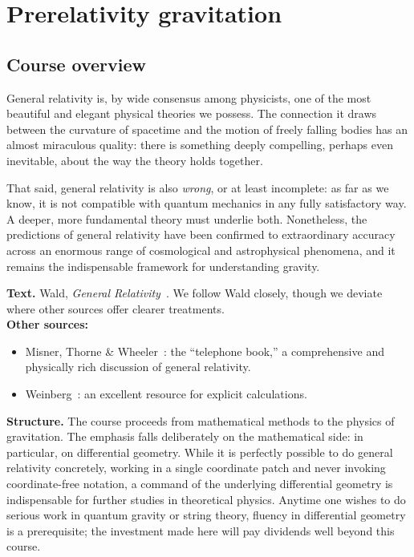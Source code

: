 
\section{Prerelativity gravitation}\label{sec:prerelativity}

\subsection{Course overview}

General relativity is, by wide consensus among physicists, one of the
most beautiful and elegant physical theories we possess.  The connection
it draws between the curvature of spacetime and the motion of freely
falling bodies has an almost miraculous quality: there is something
deeply compelling, perhaps even inevitable, about the way the theory
holds together.

That said, general relativity is also \emph{wrong}, or at least
incomplete: as far as we know, it is not compatible with quantum
mechanics in any fully satisfactory way.  A deeper, more fundamental
theory must underlie both.  Nonetheless, the predictions of general
relativity have been confirmed to extraordinary accuracy across an
enormous range of cosmological and astrophysical phenomena, and it
remains the indispensable framework for understanding gravity.

\medskip
\noindent\textbf{Text.} Wald, \emph{General Relativity}~\cite{Wald84}.
We follow Wald closely, though we deviate where other sources offer
clearer treatments.\\
\textbf{Other sources:}
\begin{itemize}
  \item Misner, Thorne \& Wheeler~\cite{MTW73}: the ``telephone
    book,'' a comprehensive and physically rich discussion of general
    relativity.
  \item Weinberg~\cite{Weinberg72}: an excellent resource for
    explicit calculations.
\end{itemize}

\noindent\textbf{Structure.}
The course proceeds from mathematical methods to the physics of
gravitation.  The emphasis falls deliberately on the mathematical
side: in particular, on differential geometry.  While it is perfectly
possible to do general relativity concretely, working in a single
coordinate patch and never invoking coordinate-free notation, a
command of the underlying differential geometry is indispensable for
further studies in theoretical physics.  Anytime one wishes to do
serious work in quantum gravity or string theory, fluency in
differential geometry is a prerequisite; the investment made here will
pay dividends well beyond this course.

